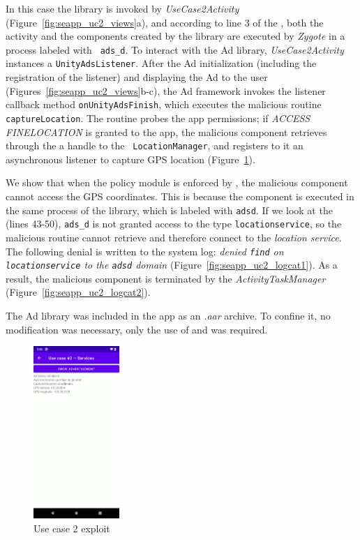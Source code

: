 In this case the library is invoked by {\em UseCase2Activity}
(Figure~\ref{fig:seapp_uc2_views}a), and according to line 3 of the
\seappcontexts, both the activity and the components created by the
library are executed by {\em Zygote} in a process labeled with {\tt
  ads\_d}.  To interact with the Ad library, {\em UseCase2Activity}
instances a {\tt UnityAdsListener}.  After the Ad initialization
(including the registration of the listener) and displaying the Ad to
the user (Figures~\ref{fig:seapp_uc2_views}b-c), the Ad framework
invokes the listener callback method {\tt onUnityAdsFinish}, which
executes the malicious routine {\tt captureLocation}. The routine
probes the app permissions; if {\em ACCESS\textunderscore
  FINE\textunderscore LOCATION} is granted to the app, the malicious
component retrieves through the \servicemanager a handle to the {\tt
  LocationManager}, and registers to it an asynchronous listener to
capture GPS location (Figure~\ref{fig:seapp_uc2_exploit}).

We show that when the policy module is enforced by \seapp, the malicious
component cannot access the GPS coordinates. This is because the
component is executed in the same process of the library, which is
labeled with {\tt ads\textunderscore d}. If we look at the \sepolicy
(lines 43-50), {\tt ads\_d} is not granted access to the \sel type
{\tt location\textunderscore service}, so the malicious routine cannot
retrieve and therefore connect to the {\em location\textunderscore
  service}.  The following denial is written to the system log: {\em
  denied {\tt find} on {\tt location\textunderscore service} to the
  {\tt ads\textunderscore d} domain}
(Figure~\ref{fig:seapp_uc2_logcat1}). As a result, the malicious
component is terminated by the {\em ActivityTaskManager}
(Figure~\ref{fig:seapp_uc2_logcat2}).

The Ad library was included in the app as an {\em .aar}
archive. To confine it, no modification was necessary, only
the use of \manifest and \sepolicy was required.

\begin{figure}[h]
  \centering
\includegraphics[width=0.29\textwidth]{chapters/seapp/figs/ae/uc24.png}
  \caption{\label{fig:seapp_uc2_exploit} Use case 2 exploit}  
\end{figure}  

